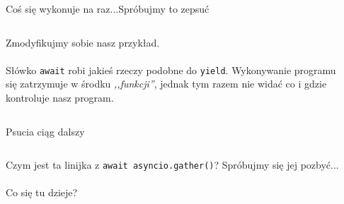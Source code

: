 \documentclass[aspectratio=169]{beamer}
\begin{document}
\begin{frame}{Coś się wykonuje na raz...}{Spróbujmy to zepsuć}
  \begin{columns}
    \begin{column}{.48 \textwidth}
      Zmodyfikujmy sobie nasz przykład.\\~\\
      
      Słówko \texttt{await} robi jakieś rzeczy podobne 
      do \texttt{yield}. Wykonywanie programu się zatrzymuje w
      środku \emph{,,funkcji''}, jednak tym razem nie widać co i gdzie
      kontroluje nasz program.
    \end{column}
    
    \begin{column}{.48 \textwidth}
      \scriptsize
      \inputminted[linenos]{python}{./examples/asyncTasks2.py}
    \end{column}
  \end{columns}
\end{frame}

\begin{frame}{Psucia ciąg dalszy}
  \begin{columns}
    \begin{column}{.48 \textwidth}
      Czym jest ta linijka z \texttt{await asyncio.gather()}?
      Spróbujmy się jej pozbyć...\\~\\

      Co się tu dzieje?
    \end{column}
    
    \begin{column}{.48 \textwidth}
      \scriptsize
      \inputminted[linenos]{python}{./examples/asyncTasks3.py}
    \end{column}
  \end{columns}
\end{frame}
\end{document}
